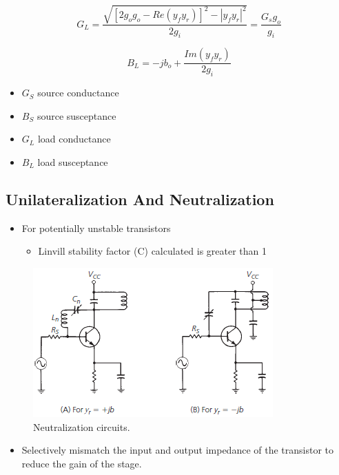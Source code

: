 \begin{equation}
G_L=\dfrac{\sqrt{[2g_og_o-Re(y_fy_r)]^2-|y_fy_r|^2}}{2g_i}=\dfrac{G_sg_o}{g_i}
\end{equation}

\begin{equation}
B_L=-jb_o+\dfrac{Im(y_fy_r)}{2g_i}
\end{equation}

\begin{itemize}
	\item $G_S$ source conductance
	\item $B_S$ source susceptance
	\item $G_L$ load conductance
	\item $B_L$ load susceptance
\end{itemize}

\subsection{Unilateralization And Neutralization}
\begin{itemize}
	\item For potentially unstable transistors
	\begin{itemize}
		\item Linvill stability factor (C) calculated is greater than 1
	\end{itemize}
\end{itemize}

\begin{figure} [H]
	\centering
	\includegraphics[width=0.6\linewidth]{graphics/41.png}
	\caption{Neutralization circuits.}
	\label{fig:41}
\end{figure}

\begin{itemize}
	\item Selectively mismatch the input and output impedance of the transistor to reduce the gain of the stage.
\end{itemize}



